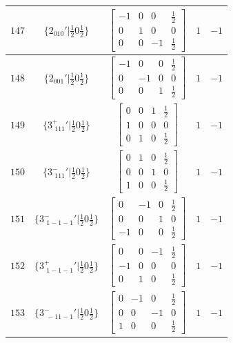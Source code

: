 \documentclass[fleqn,8pt]{jsarticle}
\begin{document}
\begin{longtable}{ccccc}
$ 147 $ & $ \{2{}_{010}{}'|\frac{1}{2} 0 \frac{1}{2}\} $ & $ \begin{bmatrix} -1 & 0 & 0 & \frac{1}{2} \\ 0 & 1 & 0 & 0 \\ 0 & 0 & -1 & \frac{1}{2} \end{bmatrix} $ & $ 1 $ & $ -1 $ \\ \hline
$ 148 $ & $ \{2{}_{001}{}'|\frac{1}{2} 0 \frac{1}{2}\} $ & $ \begin{bmatrix} -1 & 0 & 0 & \frac{1}{2} \\ 0 & -1 & 0 & 0 \\ 0 & 0 & 1 & \frac{1}{2} \end{bmatrix} $ & $ 1 $ & $ -1 $ \\ \hline
$ 149 $ & $ \{3^{+}_{\,\,111}{}'|\frac{1}{2} 0 \frac{1}{2}\} $ & $ \begin{bmatrix} 0 & 0 & 1 & \frac{1}{2} \\ 1 & 0 & 0 & 0 \\ 0 & 1 & 0 & \frac{1}{2} \end{bmatrix} $ & $ 1 $ & $ -1 $ \\ \hline
$ 150 $ & $ \{3^{-}_{\,\,111}{}'|\frac{1}{2} 0 \frac{1}{2}\} $ & $ \begin{bmatrix} 0 & 1 & 0 & \frac{1}{2} \\ 0 & 0 & 1 & 0 \\ 1 & 0 & 0 & \frac{1}{2} \end{bmatrix} $ & $ 1 $ & $ -1 $ \\ \hline
$ 151 $ & $ \{3^{-}_{\,\,1-1-1}{}'|\frac{1}{2} 0 \frac{1}{2}\} $ & $ \begin{bmatrix} 0 & -1 & 0 & \frac{1}{2} \\ 0 & 0 & 1 & 0 \\ -1 & 0 & 0 & \frac{1}{2} \end{bmatrix} $ & $ 1 $ & $ -1 $ \\ \hline
$ 152 $ & $ \{3^{+}_{\,\,1-1-1}{}'|\frac{1}{2} 0 \frac{1}{2}\} $ & $ \begin{bmatrix} 0 & 0 & -1 & \frac{1}{2} \\ -1 & 0 & 0 & 0 \\ 0 & 1 & 0 & \frac{1}{2} \end{bmatrix} $ & $ 1 $ & $ -1 $ \\ \hline
$ 153 $ & $ \{3^{-}_{\,\,-11-1}{}'|\frac{1}{2} 0 \frac{1}{2}\} $ & $ \begin{bmatrix} 0 & -1 & 0 & \frac{1}{2} \\ 0 & 0 & -1 & 0 \\ 1 & 0 & 0 & \frac{1}{2} \end{bmatrix} $ & $ 1 $ & $ -1 $ \\ \hline

\end{longtable}
\end{document}
